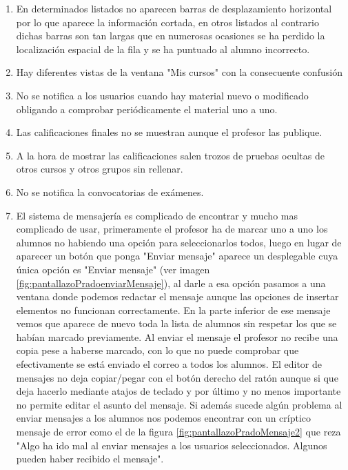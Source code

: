 \begin{enumerate}
\item En determinados listados no aparecen barras de desplazamiento horizontal por lo que aparece la información cortada, en otros listados al contrario dichas barras son tan largas que en numerosas  ocasiones se ha perdido la localización espacial de la fila y se ha puntuado al alumno incorrecto.

\item Hay diferentes vistas de la ventana "Mis cursos" con la consecuente confusión

\item No se notifica a los usuarios cuando hay material nuevo o modificado obligando a comprobar periódicamente el material uno a uno.

\item Las calificaciones finales no se muestran aunque el profesor las publique.

\item A la hora de mostrar las calificaciones salen trozos de pruebas ocultas de otros cursos y otros grupos sin rellenar.

\item No se notifica la convocatorias de exámenes.

\item El sistema de mensajería es complicado de encontrar y mucho mas complicado de usar, primeramente el profesor ha de marcar uno a uno los alumnos no habiendo una opción para seleccionarlos todos, luego en lugar de aparecer un botón que ponga "Enviar mensaje" aparece un desplegable cuya única opción es "Enviar mensaje" (ver imagen \ref{fig:pantallazoPradoenviarMensaje}), al darle a esa opción pasamos a una ventana donde podemos redactar el mensaje aunque las opciones de insertar elementos no funcionan correctamente. En la parte inferior de ese mensaje vemos que aparece de nuevo toda la lista de alumnos sin respetar los que se habían marcado previamente. Al enviar el mensaje el profesor no recibe una copia pese a haberse marcado, con lo que no puede comprobar que efectivamente se está enviado el correo a todos los alumnos. El editor de mensajes no deja copiar/pegar con el botón derecho del ratón aunque si que deja hacerlo mediante atajos de teclado y por último y no menos importante no permite editar el asunto del mensaje. Si además sucede algún problema al enviar mensajes a los alumnos nos podemos encontrar con un críptico mensaje de error como el de la figura \ref{fig:pantallazoPradoMensaje2} que reza "Algo ha ido mal al enviar mensajes a los usuarios seleccionados. Algunos pueden haber recibido el mensaje".



\end{enumerate}
